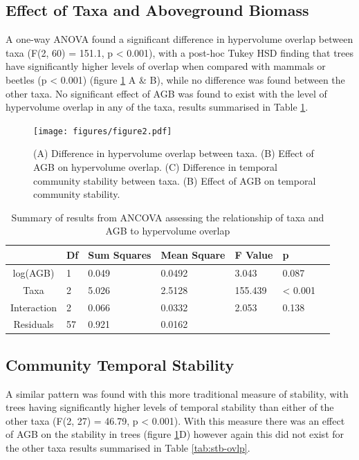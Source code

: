\subsection{Effect of Taxa and Aboveground Biomass}

A one-way ANOVA found a significant difference in hypervolume overlap between taxa (F(2, 60) = 151.1, p < 0.001), with a post-hoc Tukey HSD finding that trees have significantly higher levels of overlap when compared with mammals or beetles (p < 0.001) (figure \ref{fig:2} A \& B), while no difference was found between the other taxa. No significant effect of AGB was found to exist with the level of hypervolume overlap in any of the taxa, results summarised in Table \ref{tab:hv-ovlp}.

\begin{figure}[H]
	\centering
	\texttt{[image: figures/figure2.pdf]}
	\caption{(A) Difference in hypervolume overlap between taxa. (B) Effect of AGB on hypervolume overlap. (C) Difference in temporal community stability between taxa. (B) Effect of AGB on temporal community stability.}
	\label{fig:2}
\end{figure}

\begin{table}[H]
	\singlespacing
	\caption{Summary of results from ANCOVA assessing the relationship of taxa and AGB to hypervolume overlap}
	\label{tab:hv-ovlp}
	\begin{tabular*}{\textwidth}{c @{\extracolsep{\fill}} @{}llllll@{}}
		\toprule
		& \textbf{Df} & \textbf{Sum Squares} & \textbf{Mean Square} & \textbf{F Value} & \textbf{p} \\ \midrule
		log(AGB)    & 1  & 0.049       & 0.0492      & 3.043   & 0.087   \\
		Taxa        & 2  & 5.026       & 2.5128      & 155.439 & < 0.001 \\
		Interaction & 2  & 0.066       & 0.0332      & 2.053   & 0.138   \\
		Residuals   & 57 & 0.921       & 0.0162      &         &         \\ \bottomrule
	\end{tabular*}
\end{table}


\subsection{Community Temporal Stability}

A similar pattern was found with this more traditional measure of stability, with trees having significantly higher levels of temporal stability than either of the other taxa (F(2, 27) = 46.79, p < 0.001). With this measure there was an effect of AGB on the stability in trees (figure \ref{fig:2}D) however again this did not exist for the other taxa results summarised in Table \ref{tab:stb-ovlp}.

